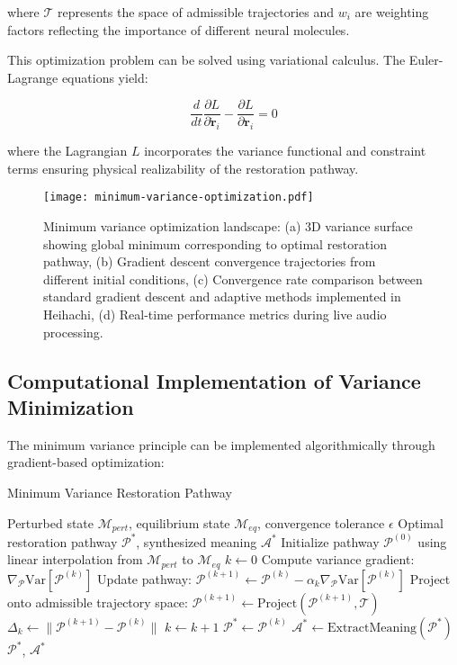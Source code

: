 \documentclass[12pt,a4paper]{article}
\begin{document}
where $\mathcal{T}$ represents the space of admissible trajectories and $w_i$ are weighting factors reflecting the importance of different neural molecules.

This optimization problem can be solved using variational calculus. The Euler-Lagrange equations yield:

\begin{equation}
\frac{d}{dt} \frac{\partial L}{\partial \dot{\mathbf{r}}_i} - \frac{\partial L}{\partial \mathbf{r}_i} = 0
\end{equation}

where the Lagrangian $L$ incorporates the variance functional and constraint terms ensuring physical realizability of the restoration pathway.

\begin{figure}[h]
\centering
\texttt{[image: minimum-variance-optimization.pdf]}
\caption{Minimum variance optimization landscape: (a) 3D variance surface showing global minimum corresponding to optimal restoration pathway, (b) Gradient descent convergence trajectories from different initial conditions, (c) Convergence rate comparison between standard gradient descent and adaptive methods implemented in Heihachi, (d) Real-time performance metrics during live audio processing.}
\label{fig:variance_optimization}
\end{figure}

\subsection{Computational Implementation of Variance Minimization}

The minimum variance principle can be implemented algorithmically through gradient-based optimization:

\begin{algorithm}
\caption{Minimum Variance Restoration Pathway}
\begin{algorithmic}[1]
\REQUIRE Perturbed state $\mathcal{M}_{pert}$, equilibrium state $\mathcal{M}_{eq}$, convergence tolerance $\epsilon$
\ENSURE Optimal restoration pathway $\mathcal{P}^*$, synthesized meaning $\mathcal{A}^*$
\STATE Initialize pathway $\mathcal{P}^{(0)}$ using linear interpolation from $\mathcal{M}_{pert}$ to $\mathcal{M}_{eq}$
\STATE $k \leftarrow 0$
\REPEAT
    \STATE Compute variance gradient: $\nabla_{\mathcal{P}} \text{Var}[\mathcal{P}^{(k)}]$
    \STATE Update pathway: $\mathcal{P}^{(k+1)} \leftarrow \mathcal{P}^{(k)} - \alpha_k \nabla_{\mathcal{P}} \text{Var}[\mathcal{P}^{(k)}]$
    \STATE Project onto admissible trajectory space: $\mathcal{P}^{(k+1)} \leftarrow \text{Project}(\mathcal{P}^{(k+1)}, \mathcal{T})$
    \STATE $\Delta_k \leftarrow \| \mathcal{P}^{(k+1)} - \mathcal{P}^{(k)} \|$
    \STATE $k \leftarrow k + 1$
\STATE $\mathcal{P}^* \leftarrow \mathcal{P}^{(k)}$
\STATE $\mathcal{A}^* \leftarrow \text{ExtractMeaning}(\mathcal{P}^*)$
\RETURN $\mathcal{P}^*$, $\mathcal{A}^*$
\end{algorithmic}
\end{algorithm}
\end{document}

